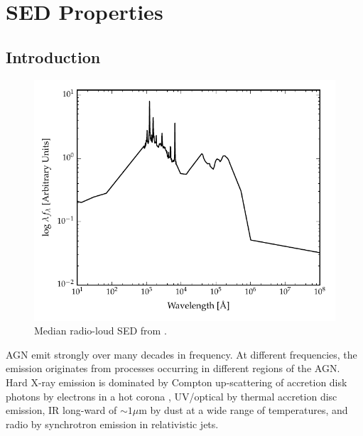 
\chapter{SED Properties}
\label{ch:sed} 



\section{Introduction}

\begin{figure}
  \centering
  \includegraphics[width=\textwidth]{figures/chapter05/shangsed.pdf}
  \caption{Median radio-loud SED from \citet{shang11}.}
  \label{fig:seyfert_sed}
\end{figure}

AGN emit strongly over many decades in frequency. 
At different frequencies, the emission originates from processes occurring in different regions of the \ac{AGN}. 
Hard X-ray emission is dominated by Compton up-scattering of accretion disk photons by electrons in a hot corona \citep[e.g.][]{sunyaev80}, \ac{UV}/optical by thermal accretion disc emission, \ac{IR} long-ward of $\sim1\mu$m  by dust at a wide range of temperatures, and radio by synchrotron emission in relativistic jets.   

